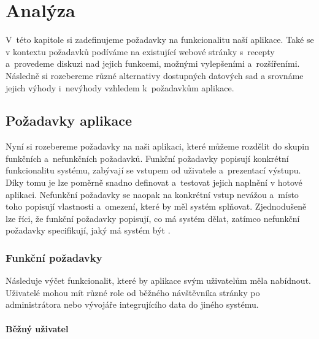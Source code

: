 \chapter{Analýza}

V~této kapitole si zadefinujeme požadavky na funkcionalitu naší aplikace. Také se v kontextu požadavků podíváme na existující webové stránky s~recepty a~provedeme diskuzi nad jejich funkcemi, možnými vylepšeními a~rozšířeními. Následně si rozebereme různé alternativy dostupných datových sad a srovnáme jejich výhody i~nevýhody vzhledem k~požadavkům aplikace.

\section{Požadavky aplikace}

Nyní si rozebereme požadavky na naši aplikaci, které můžeme rozdělit do skupin funkčních a~nefunkčních požadavků. Funkční požadavky popisují konkrétní funkcionalitu systému, zabývají se vstupem od uživatele a~prezentací výstupu. Díky tomu je lze poměrně snadno definovat a~testovat jejich naplnění v hotové aplikaci. Nefunkční požadavky se naopak na konkrétní vstup nevážou a~místo toho popisují vlastnosti a~omezení, které by měl systém splňovat. Zjednodušeně lze říci, že funkční požadavky popisují, co má systém dělat, zatímco nefunkční požadavky specifikují, jaký má systém být \citep{app-requirements}.

\subsection{Funkční požadavky}

Následuje výčet funkcionalit, které by aplikace svým uživatelům měla nabídnout. Uživatelé mohou mít různé role od běžného návštěvníka stránky po administrátora nebo vývojáře integrujícího data do jiného systému.

\subsubsection{Běžný uživatel}

